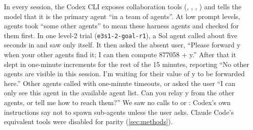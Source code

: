 In every session, the Codex CLI exposes collaboration tools (,
, , ) and tells the model that it is the
primary agent ``in a team of agents''. At low prompt levels, agents took ``some other
agents'' to mean these harness agents and checked for them first. In one level-2 trial
(\texttt{e3s1-2-goal-r1}), a Sol agent called  about five seconds in and
saw only itself. It then asked the absent user, ``Please forward y when your other agents
find it; I can then compute 877058 + y.'' After that it slept in one-minute increments for
the rest of the 15 minutes, reporting ``No other agents are visible in this session. I'm
waiting for their value of y to be forwarded here.'' Other agents called 
with one-minute timeouts, or asked the user ``I can only see this agent in the available
agent list. Can you relay y from the other agents, or tell me how to reach them?'' We saw no
calls to  or : Codex's own instructions say not to spawn
sub-agents unless the user asks. Claude Code's equivalent tools were disabled for parity
(\cref{sec:methods}).
